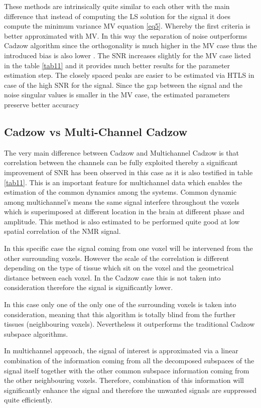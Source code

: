 These methods are intrinsically quite similar to each other with the main difference that instead of computing the LS solution for the signal it does compute the minimum variance MV equation \ref{eq5}. Whereby the first criteria is better approximated with MV. In this way the separation of noise outperforms Cadzow algorithm since the orthogonality is much higher in the MV case thus the introduced bias is also lower \cite{11}. The SNR increases slightly for the MV case listed in the table \ref{tab11} and it provides much better results for the parameter estimation step. The closely spaced peaks are easier to be estimated via HTLS in case of the high SNR for the signal. Since the gap between the signal and the noise singular values is smaller in the MV case, the estimated parameters preserve better accuracy \cite{11} 

\subsection{Cadzow vs Multi-Channel Cadzow}

The very main difference between Cadzow and Multichannel Cadzow is that correlation between the channels can be fully exploited thereby a significant improvement of SNR has been observed in this case\cite{14}  as it is also testified in table \ref{tab11}. This is an important feature for multichannel data which enables the estimation of the common dynamics among the systems. Common dynamic among multichannel's means the same signal interfere throughout the voxels which is superimposed at different location in the brain at different phase and amplitude. This method is also estimated to be performed quite good at low spatial correlation of the NMR signal\cite{15}.

In this specific case the signal coming from one voxel will be intervened from the other surrounding voxels. However the scale of the correlation is different depending on the type of tissue which sit on the voxel and the geometrical distance between each voxel. In the Cadzow case this is not taken into consideration therefore the signal is significantly lower. 

In this case only one of the only one of the surrounding voxels is taken into consideration, meaning that this algorithm is totally  blind from the further tissues (neighbouring voxels). Nevertheless it outperforms the traditional Cadzow subspace algorithms. 

In multichannel approach, the signal of interest is approximated via a linear combination of the information coming from all the decomposed subspaces of the signal itself together with the other common subspace information coming from the other neighbouring voxels. Therefore, combination of this information will significantly enhance the signal  and therefore the unwanted signals are suppressed quite efficiently.  


